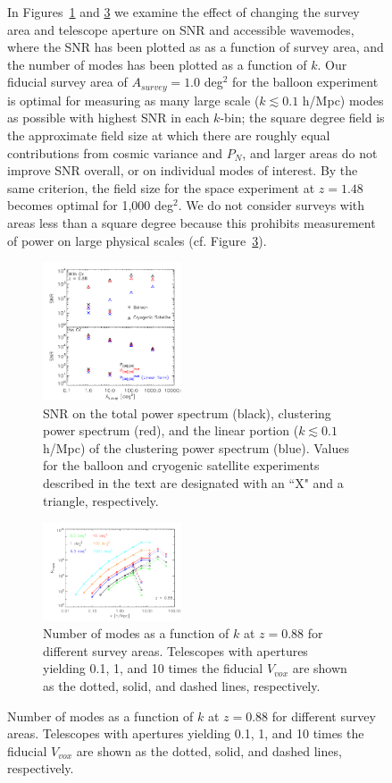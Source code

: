 \documentclass[iop,twocolappendix]{emulateapj}
\begin{document}
\begin{figure}[t]
In Figures~\ref{fig:snr_asurvey} and \ref{fig:nmode_k} we examine the effect of changing the survey area and telescope aperture on SNR and accessible wavemodes, where the SNR has been plotted as as a function of survey area, and the number of modes has been plotted as a function of $k$. Our fiducial survey area of $A_{survey} = 1.0$ deg$^2$ for the balloon experiment is optimal for measuring as many large scale ($k\lesssim0.1$ h/Mpc) modes as possible with highest SNR in each $k$-bin; the square degree field is the approximate field size at which there are roughly equal contributions from cosmic variance and $P_N$, and larger areas do not improve SNR overall, or on individual modes of interest. By the same criterion, the field size for the space experiment at $z = 1.48$ becomes optimal for 1,000 deg$^2$. We do not consider surveys with areas less than a square degree because this prohibits measurement of power on large physical scales (cf. Figure~\ref{fig:nmode_k}).

\begin{figure}[b]
\centering
\includegraphics[width=0.45\textwidth]{snr_tot_clust_lin_asurvey_z88_450hr}
\caption{SNR on the total power spectrum (black), clustering power spectrum (red), and the linear portion ($k\lesssim0.1$ h/Mpc) of the clustering power spectrum (blue). Values for the balloon and cryogenic satellite experiments described in the text are designated with an ``X" and a triangle, respectively.}
\label{fig:snr_asurvey}
\end{figure}

\begin{figure}[h]
\centering
\includegraphics[width=0.45\textwidth]{nmode_vs_k_z88_100sqdeg_1000sqdeg}
\caption{Number of modes as a function of $k$ at $z=0.88$ for different survey areas. Telescopes with apertures yielding 0.1, 1, and 10 times the fiducial $V_{vox}$ are shown as the dotted, solid, and dashed lines, respectively.}
\label{fig:nmode_k}
\end{figure}


\end{figure}
\end{document}
